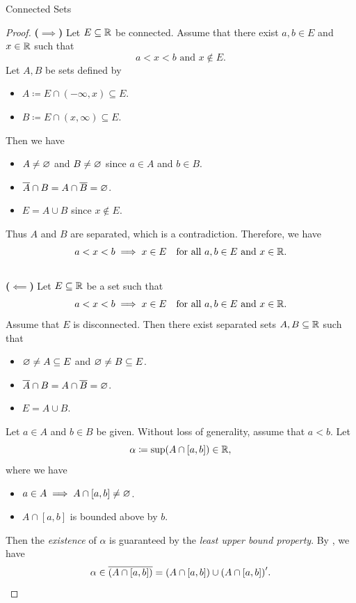 \begin{section}{Connected Sets}
\begin{proof}
    \textbf{($\implies$)} Let $E \subseteq \mathbb{R}$ be connected. Assume that there exist $a, b \in E$ and $x \in \mathbb{R}$ such that
    \[
    a < x < b \text{ and } x \notin E.
    \]
    Let $A, B$ be sets defined by
    \begin{itemize}
        \item $A \coloneqq E \cap (-\infty, x) \subseteq E$.
        \item $B \coloneqq E \cap (x, \infty) \subseteq E$.
    \end{itemize}
    Then we have
    \begin{itemize}
        \item $A \neq \varnothing$ and $B \neq \varnothing$ since $a \in A$ and $b \in B$.
        \item $\overline{A} \cap B = A \cap \overline{B} = \varnothing$.
        \item $E = A \cup B$ since $x \notin E$.
    \end{itemize}
    Thus $A$ and $B$ are separated, which is a contradiction. Therefore, we have
    \[
    a < x < b \implies x \in E \quad \text{for all } a, b \in E \text{ and } x \in \mathbb{R}.
    \]
    \\[6mm]
    \textbf{($\impliedby$)} Let $E \subseteq \mathbb{R}$ be a set such that
    \[
    a < x < b \implies x \in E \quad \text{for all } a, b \in E \text{ and } x \in \mathbb{R}.
    \]
    Assume that $E$ is disconnected. Then there exist separated sets $A, B \subseteq \mathbb{R}$ such that
    \begin{itemize}
        \item $\varnothing \neq A \subseteq E$ and $\varnothing \neq B \subseteq E$.
        \item $\overline{A} \cap B = A \cap \overline{B} = \varnothing$.
        \item $E = A \cup B$.
    \end{itemize}
    Let $a \in A$ and $b \in B$ be given. Without loss of generality, assume that $a < b$. Let
    \[
    \alpha \coloneqq \sup\paren*{A \cap [a, b]} \in \R,
    \]
    where we have
    \begin{itemize}
        \item $a \in A \implies A \cap [a, b] \neq \varnothing$.
        \item $A \cap [a, b]$ is bounded above by $b$.
    \end{itemize}
    Then the \emph{existence} of $\alpha$ is guaranteed by the \emph{least upper bound property}.
    By , we have
    \[
    \alpha \in \overline{\paren*{A \cap [a, b]}} = \paren*{A \cap [a, b]} \cup \paren*{A \cap [a, b]}'.
\]
\end{proof}
\end{section}
